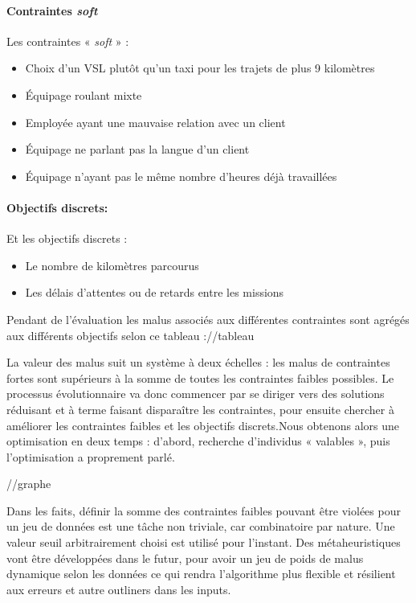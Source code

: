 \documentclass[french, 11pt]{memoir}
\begin{document}
\paragraph{Contraintes \emph{soft}}\label{contraintes-soft}

Les contraintes « \emph{soft} » :

\begin{itemize}
	\item
	Choix d'un VSL plutôt qu'un taxi pour les trajets de plus 9 kilomètres
	\item
	Équipage roulant mixte
	\item
	Employée ayant une mauvaise relation avec un client
	\item
	Équipage ne parlant pas la langue d'un client
	\item
	Équipage n'ayant pas le même nombre d'heures déjà travaillées
\end{itemize}

\paragraph{Objectifs discrets:}\label{objectifs-discrets}

Et les objectifs discrets :

\begin{itemize}
	\item
	Le nombre de kilomètres parcourus
	\item
	Les délais d'attentes ou de retards entre les missions
\end{itemize}

Pendant de l'évaluation les malus associés aux différentes contraintes
sont agrégés aux différents objectifs selon ce tableau ://tableau

La valeur des malus suit un système à deux échelles : les malus de
contraintes fortes sont supérieurs à la somme de toutes les contraintes
faibles possibles. Le processus évolutionnaire va donc commencer par se
diriger vers des solutions réduisant et à terme faisant disparaître les
contraintes, pour ensuite chercher à améliorer les contraintes faibles
et les objectifs discrets.Nous obtenons alors une optimisation en deux
temps : d'abord, recherche d'individus « valables », puis l'optimisation
a proprement parlé.

//graphe

Dans les faits, définir la somme des contraintes faibles pouvant être
violées pour un jeu de données est une tâche non triviale, car
combinatoire par nature. Une valeur seuil arbitrairement choisi est
utilisé pour l'instant. Des métaheuristiques vont être développées dans
le futur, pour avoir un jeu de poids de malus dynamique selon les
données ce qui rendra l'algorithme plus flexible et résilient aux
erreurs et autre outliners dans les inputs.
\end{document}
